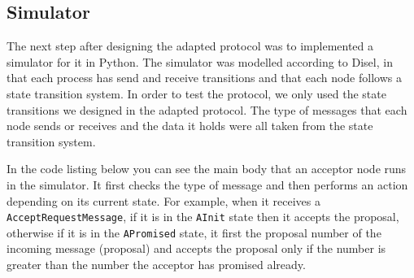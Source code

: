 %
%

\subsection{Simulator}
The next step after designing the adapted protocol was to
implemented a simulator for it in Python. The simulator was modelled according
to Disel, in that each process has send and receive transitions and that each
node follows a state transition system. In order to test the protocol, we only
used the state transitions we designed in the adapted protocol. The type
of messages that each node sends or receives and the data it holds
were all taken from the state transition system.

In the code listing below you can see the main body that an acceptor node
runs in the simulator. It first checks the type of message and then performs
an action depending on its current state. For example, when it receives a
\texttt{AcceptRequestMessage}, if it is in the \texttt{AInit} state then it
accepts the proposal, otherwise if it is in the \texttt{APromised} state, it
first the proposal number of the incoming message (proposal)
and accepts the proposal only if the number is greater than the number
the acceptor has promised already.

